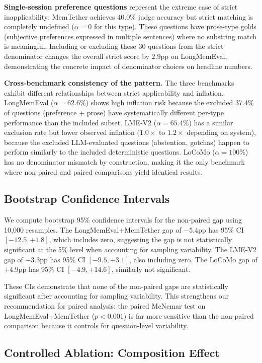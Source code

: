 \documentclass{article}
\begin{document}
\textbf{Single-session preference questions} represent the extreme case of strict inapplicability: MemTether achieves 40.0\% judge accuracy but strict matching is completely undefined ($\alpha = 0$ for this type). These questions have prose-type golds (subjective preferences expressed in multiple sentences) where no substring match is meaningful. Including or excluding these 30 questions from the strict denominator changes the overall strict score by $2.9$pp on LongMemEval, demonstrating the concrete impact of denominator choices on headline numbers.

\textbf{Cross-benchmark consistency of the pattern.} The three benchmarks exhibit different relationships between strict applicability and inflation. LongMemEval ($\alpha = 62.6\%$) shows high inflation risk because the excluded 37.4\% of questions (preference + prose) have systematically different per-type performance than the included subset. LME-V2 ($\alpha = 65.4\%$) has a similar exclusion rate but lower observed inflation ($1.0\times$ to $1.2\times$ depending on system), because the excluded LLM-evaluated questions (abstention, gotchas) happen to perform similarly to the included deterministic questions. LoCoMo ($\alpha = 100\%$) has no denominator mismatch by construction, making it the only benchmark where non-paired and paired comparisons yield identical results.

\subsection{Bootstrap Confidence Intervals}
We compute bootstrap 95\% confidence intervals for the non-paired gap using 10{,}000 resamples. The LongMemEval+MemTether gap of $-5.4$pp has 95\% CI $[-12.5, +1.8]$, which includes zero, suggesting the gap is not statistically significant at the 5\% level when accounting for sampling variability. The LME-V2 gap of $-3.3$pp has 95\% CI $[-9.5, +3.1]$, also including zero. The LoCoMo gap of $+4.9$pp has 95\% CI $[-4.9, +14.6]$, similarly not significant.

These CIs demonstrate that none of the non-paired gaps are statistically significant after accounting for sampling variability. This strengthens our recommendation for paired analysis: the paired McNemar test on LongMemEval+MemTether ($p < 0.001$) is far more sensitive than the non-paired comparison because it controls for question-level variability.



\subsection{Controlled Ablation: Composition Effect}
\end{document}
